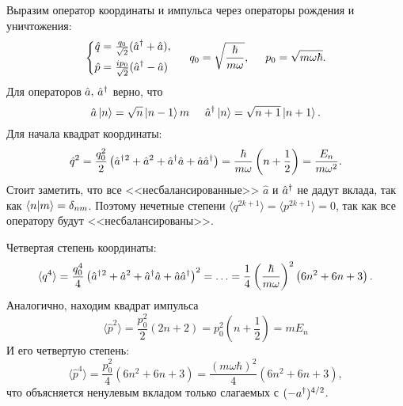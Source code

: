 Выразим оператор координаты и импульса через операторы рождения и уничтожения:
\begin{equation*}
    \left\{\begin{aligned}
        \hat{q} &= \tfrac{q_0}{\sqrt{2}} (\hat{a}^{\dag} + \hat{a}), \\ 
        \hat{p} &= \tfrac{i p_0}{\sqrt{2}} (\hat{a}^{\dag} - \hat{a})
    \end{aligned}\right.
    \hspace{5 mm} 
    q_0 =\sqrt{ \frac{\hbar}{m \omega}},
    \hspace{5 mm} 
    p_0 = \sqrt{m \omega \hbar}.
\end{equation*}
Для операторов $\hat{a},\, \hat{a}^{\dag}$ верно, что
\begin{equation*}
    \hat{a} \left| n \right\rangle = \sqrt{n} \left| n-1 \right\rangle m
    \hspace{5 mm} 
    \hat{a}^{\dag} \left| n \right\rangle = \sqrt{n+1} \left| n+1 \right\rangle.
\end{equation*}
Для начала квадрат координаты:
\begin{equation*}
    \hat{q}^2 = \frac{q_0^2}{2} \left(
        \hat{a}^{\dag}{}^2 + \hat{a}^2 + \hat{a}^{\dag} \hat{a} + \hat{a} \hat{a}^{\dag}
    \right) = \frac{\hbar}{m \omega} \left(n + \frac{1}{2}\right) = \frac{E_n}{m \omega^2}.
\end{equation*}
Стоит заметить, что все <<несбалансированные>> $\hat{a}$ и $\hat{a}^{\dag}$ не дадут вклада, так как $\bk{n}{m} = \delta_{nm}$.  Поэтому нечетные степени $\langle q^{2k+1}\rangle = \langle p^{2k+1}\rangle = 0$, так как все оператору будут <<несбалансированы>>.

Четвертая степень координаты:
\begin{equation*}
    \langle q^4\rangle = \frac{q_0^4}{4}\left(
        \hat{a}^{\dag}{}^2 + \hat{a}^2 + \hat{a}^{\dag} \hat{a} + \hat{a} \hat{a}^{\dag}
    \right)^2 = \ldots = \frac{1}{4} \left(\frac{\hbar}{m \omega}\right)^2 \left(6 n^2 + 6n + 3\right).
\end{equation*}
Аналогично, находим квадрат импульса
\begin{equation*}
    \langle \hat{p}^2\rangle = \frac{p_0^2}{2}(2n + 2) 
    =
    p_0^2 \left(n + \frac{1}{2}\right)
    = m E_n
\end{equation*}
И его четвертую степень:
\begin{equation*}
    \langle \hat{p}^4\rangle = \frac{p_0^2}{4} (6 n^2 + 6n + 3) = 
    \frac{(m \omega \hbar)^2}{4} (6 n^2 + 6n + 3)
    ,
\end{equation*}
что объясняется ненулевым вкладом только слагаемых с $(-a^{\dag}{})^{4/2}$.

